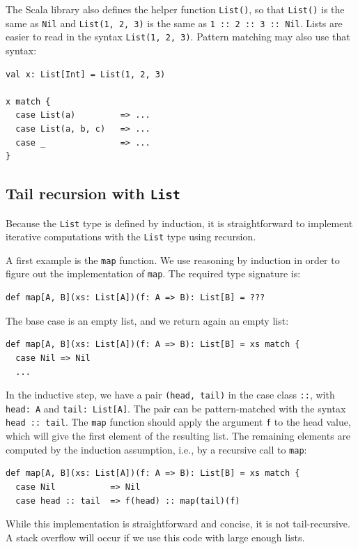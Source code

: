 The Scala library also defines the helper function \lstinline!List()!,
so that \lstinline!List()! is the same as \lstinline!Nil! and \lstinline!List(1, 2, 3)!
is the same as \lstinline!1 :: 2 :: 3 :: Nil!. Lists are easier to
read in the syntax \lstinline!List(1, 2, 3)!. Pattern matching may
also use that syntax:
\begin{lstlisting}
val x: List[Int] = List(1, 2, 3)

x match {
  case List(a)         => ...
  case List(a, b, c)   => ...
  case _               => ...
}
\end{lstlisting}


\subsection{Tail recursion with \texttt{List}\label{subsec:Tail-recursion-with-list}}

Because the \lstinline!List! type is defined by induction, it is
straightforward to implement iterative computations with the \lstinline!List!
type using recursion.

A first example is the \lstinline!map! function. We use reasoning
by induction in order to figure out the implementation of \lstinline!map!.
The required type signature is:
\begin{lstlisting}
def map[A, B](xs: List[A])(f: A => B): List[B] = ???
\end{lstlisting}
The base case is an empty list, and we return again an empty list:
\begin{lstlisting}
def map[A, B](xs: List[A])(f: A => B): List[B] = xs match {
  case Nil => Nil
  ...
\end{lstlisting}
In the inductive step, we have a pair \lstinline!(head, tail)! in
the case class \lstinline!::!, with \lstinline!head: A! and \lstinline!tail: List[A]!.
The pair can be pattern-matched with the syntax \lstinline!head :: tail!.
The \lstinline!map! function should apply the argument \lstinline!f!
to the head value, which will give the first element of the resulting
list. The remaining elements are computed by the induction assumption,
i.e., by a recursive call to \lstinline!map!:
\begin{lstlisting}
def map[A, B](xs: List[A])(f: A => B): List[B] = xs match {
  case Nil           => Nil
  case head :: tail  => f(head) :: map(tail)(f)
\end{lstlisting}
While this implementation is straightforward and concise, it is not
tail-recursive. A stack overflow will occur if we use this code with
large enough lists.

